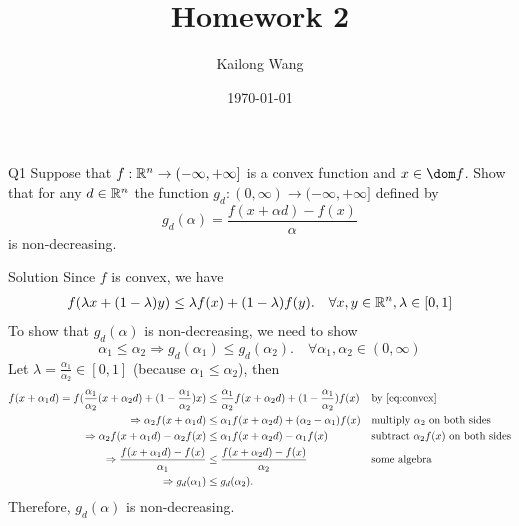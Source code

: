 \documentclass{article}
\title{Homework 2}
\author{Kailong Wang}
\date{\today}
\begin{document}
\maketitle

\begin{problem}
    {Q1}
    Suppose that $f:\mathbb{R}^n\rightarrow(-\infty, +\infty]$ is a convex function and $x \in \dom f$. Show that for any $d\in\mathbb{R}^n$ the function $g_d:(0,\infty)\rightarrow(-\infty,+\infty]$ defined by
    \[
        g_d(\alpha) = \frac{f(x+\alpha d)-f(x)}{\alpha}
    \]
    is non-decreasing.
\end{problem}

\begin{solution}
    {Solution}
    Since $f$ is convex, we have
    \begin{align}
        f(\lambda x + (1-\lambda)y) \leq \lambda f(x) + (1-\lambda)f(y). \quad \forall x, y \in \mathbb{R}^n, \lambda \in [0, 1] \label{eq:convex}
    \end{align}
    To show that $g_d(\alpha)$ is non-decreasing, we need to show
    \[\alpha_1 \leq \alpha_2 \Rightarrow g_d(\alpha_1) \leq g_d(\alpha_2). \quad \forall \alpha_1, \alpha_2 \in (0, \infty)\]
    Let $\lambda=\frac{\alpha_1}{\alpha_2}\in[0,1]$ (because $\alpha_1 \leq \alpha_2$), then
    \begin{align*}
        f(x+\alpha_1d) = f(\frac{\alpha_1}{\alpha_2}(x+\alpha_2d) + (1-\frac{\alpha_1}{\alpha_2})x)
        &\leq \frac{\alpha_1}{\alpha_2}f(x+\alpha_2d) + (1-\frac{\alpha_1}{\alpha_2})f(x) &&\text{by \cref{eq:convex}}\\
        \Rightarrow \alpha_2f(x+\alpha_1d)
        &\leq \alpha_1f(x+\alpha_2d) + (\alpha_2-\alpha_1)f(x) &&\text{multiply $\alpha_2$ on both sides}\\
        \Rightarrow \alpha_2f(x+\alpha_1d) - \alpha_2f(x)
        &\leq \alpha_1f(x+\alpha_2d) - \alpha_1f(x) &&\text{subtract $\alpha_2f(x)$ on both sides}\\
        \Rightarrow \frac{f(x+\alpha_1d)-f(x)}{\alpha_1}
        &\leq \frac{f(x+\alpha_2d)-f(x)}{\alpha_2} &&\text{some algebra}\\
        \Rightarrow g_d(\alpha_1) &\leq g_d(\alpha_2).
    \end{align*}
    Therefore, $g_d(\alpha)$ is non-decreasing.
\end{solution}
\end{document}
